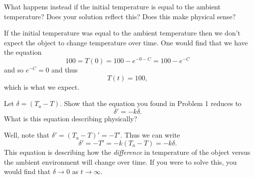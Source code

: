 \documentclass[12pt]{article} %
\begin{document}
\newpage

\begin{problem}
    What happens instead if the initial temperature is equal to the ambient temperature? Does your solution reflect this? Does this make physical sense?
\end{problem}
\begin{solution}
If the initial temperature was equal to the ambient temperature then we don't expect the object to change temperature over time.  One would find that we have the equation
\[
100=T(0)=100-e^{-0-C}=100-e^{-C}
\]
and so $e^{-C}=0$ and thus
\[
T(t)=100,
\]
which is what we expect.
\end{solution}

\newpage

\begin{problem}
    Let $\delta = (T_a-T)$. Show that the equation you found in Problem 1 reduces to
    \[
    \delta' = -k\delta.
    \]
    What is this equation describing physically?
\end{problem}
\begin{solution}
Well, note that $\delta'=(T_a-T)'=-T'$.  Thus we can write
\[
\delta'=-T'=-k(T_a-T)=-k\delta.
\]
This equation is describing how the \emph{difference} in temperature of the object versus the ambient environment will change over time. If you were to solve this, you would find that $\delta\to 0$ as $t\to \infty$.
\end{solution}

\newpage
\end{document}
